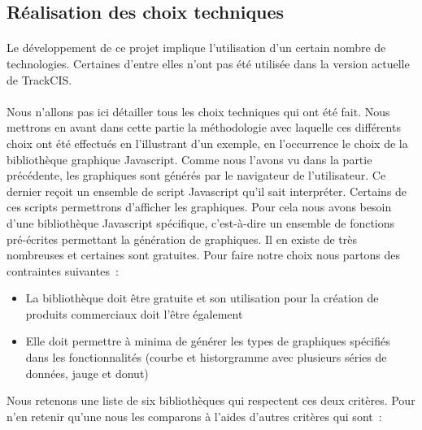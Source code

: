 		\subsection{Réalisation des choix techniques}
			\paragraph{}%
			Le développement de ce projet implique l'utilisation d'un certain nombre de
			technologies. Certaines d'entre elles n'ont pas été utilisée dans la version
			actuelle de TrackCIS.
			
			\paragraph{}%
			Nous n'allons pas ici détailler tous les choix techniques qui ont été fait.
			Nous mettrons en avant dans cette partie la méthodologie avec laquelle ces
			différents choix ont été effectués en l'illustrant d'un exemple, en
			l'occurrence le choix de la bibliothèque graphique Javascript. Comme nous
			l'avons vu dans la partie précédente, les graphiques sont
			générés par le navigateur de l'utilisateur. Ce dernier reçoit un ensemble
			de script Javascript qu'il sait interpréter. Certains de ces scripts
			permettrons d'afficher les graphiques. Pour cela nous avons besoin d'une
			bibliothèque Javascript spécifique, c'est-à-dire un ensemble de fonctions
			pré-écrites permettant la génération de graphiques.
			Il en existe de très nombreuses et certaines sont gratuites. Pour
			faire notre choix nous partons des contraintes suivantes~:
			\begin{itemize}
			  \item La bibliothèque doit être gratuite et son utilisation pour la
			  création de produits commerciaux doit l'être également
			  \item Elle doit permettre à minima de générer les types de graphiques
			  spécifiés dans les fonctionnalités (courbe et historgramme avec plusieurs
			  séries de données, jauge et donut)
			\end{itemize}
			Nous retenons une liste de six bibliothèques qui respectent ces deux
			critères.
			Pour n'en retenir qu'une nous les comparons à l'aides d'autres critères qui
			sont~:
